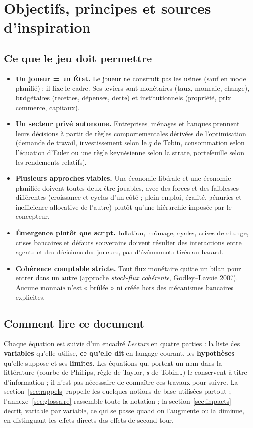 \documentclass[11pt,a4paper]{article}
\newcommand{\og}{« }
\newcommand{\fg}{ »}
\begin{document}
\section{Objectifs, principes et sources d'inspiration}

\subsection{Ce que le jeu doit permettre}
\begin{itemize}
\item \textbf{Un joueur = un État.} Le joueur ne construit pas les usines (sauf en mode planifié) : il fixe le cadre. Ses leviers sont monétaires (taux, monnaie, change), budgétaires (recettes, dépenses, dette) et institutionnels (propriété, prix, commerce, capitaux).
\item \textbf{Un secteur privé autonome.} Entreprises, ménages et banques prennent leurs décisions à partir de règles comportementales dérivées de l'optimisation (demande de travail, investissement selon le $q$ de Tobin, consommation selon l'équation d'Euler ou une règle keynésienne selon la strate, portefeuille selon les rendements relatifs).
\item \textbf{Plusieurs approches viables.} Une économie libérale et une économie planifiée doivent toutes deux être jouables, avec des forces et des faiblesses différentes (croissance et cycles d'un côté ; plein emploi, égalité, pénuries et inefficience allocative de l'autre) plutôt qu'une hiérarchie imposée par le concepteur.
\item \textbf{Émergence plutôt que script.} Inflation, chômage, cycles, crises de change, crises bancaires et défauts souverains doivent résulter des interactions entre agents et des décisions des joueurs, pas d'événements tirés au hasard.
\item \textbf{Cohérence comptable stricte.} Tout flux monétaire quitte un bilan pour entrer dans un autre (approche \emph{stock-flux cohérente}, Godley--Lavoie 2007). Aucune monnaie n'est \og brûlée\fg{} ni créée hors des mécanismes bancaires explicites.
\end{itemize}

\subsection{Comment lire ce document}
Chaque équation est suivie d'un encadré \emph{Lecture} en quatre parties : la liste des \textbf{variables} qu'elle utilise, \textbf{ce qu'elle dit} en langage courant, les \textbf{hypothèses} qu'elle suppose et ses \textbf{limites}. Les équations qui portent un nom dans la littérature (courbe de Phillips, règle de Taylor, $q$ de Tobin\ldots) le conservent à titre d'information ; il n'est pas nécessaire de connaître ces travaux pour suivre. La section~\ref{sec:rappels} rappelle les quelques notions de base utilisées partout ; l'annexe~\ref{sec:glossaire} rassemble toute la notation ; la section~\ref{sec:impacts} décrit, variable par variable, ce qui se passe quand on l'augmente ou la diminue, en distinguant les effets directs des effets de second tour.
\end{document}
